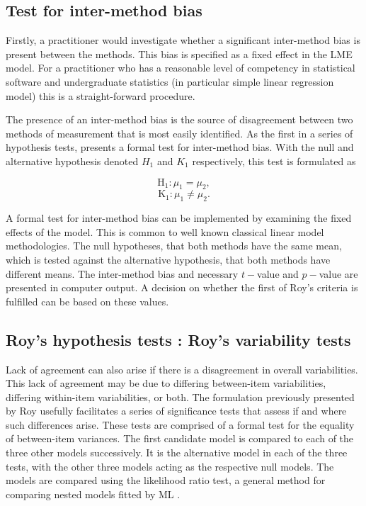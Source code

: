 \documentclass[12pt, a4paper]{report}
\theoremstyle{plain}
\theoremstyle{definition}
\theoremstyle{remark}
\begin{document}
			
			
			
			
			\subsection{Test for inter-method bias}
			
			Firstly, a practitioner would investigate whether a significant inter-method bias is present between the methods. This bias is specified as a fixed effect in the LME model.  For a practitioner who has a reasonable level of competency in statistical software and undergraduate statistics (in particular simple linear regression model) this is a straight-forward procedure.
			
			The presence of an inter-method bias is the source of disagreement between two methods of measurement that is most easily identified. As the first in a series of hypothesis tests, \citet{ARoy2009} presents a formal test for inter-method bias. With the null and alternative hypothesis denoted $H_1$ and $K_1$ respectively, this test is formulated as
			
			\[	\operatorname{H_1} : \mu_1 = \mu_2 ,\]
			\[	\operatorname{K_1} : \mu_1 \neq \mu_2.\]
			
			
			
			
			A formal test for inter-method bias can be implemented by examining the fixed effects of the model. This is common to well known classical linear model methodologies. The null hypotheses, that both methods have the same mean, which is tested against the alternative hypothesis, that both methods have different means.
			The inter-method bias and necessary $t-$value and $p-$value are presented in computer output. A decision on whether the first of Roy's criteria is fulfilled can be based on these values.
			
			
			
			\subsection{Roy's hypothesis tests : Roy's variability tests}
			
			Lack of agreement can also arise if there is a disagreement in overall variabilities. This lack of agreement may be due to differing between-item variabilities, differing within-item variabilities, or both. The formulation previously presented by Roy usefully facilitates a series of significance tests that assess if and where such differences arise. These tests are comprised of a formal test for the equality of between-item variances.
			The first candidate model is compared to each of the three other models successively. It is the alternative model in each of the three tests, with the other three models acting as the respective null models. The models are compared using the likelihood ratio test, a general method for comparing nested models fitted by ML \citep{Lehmann2006}.
			
\end{document}
